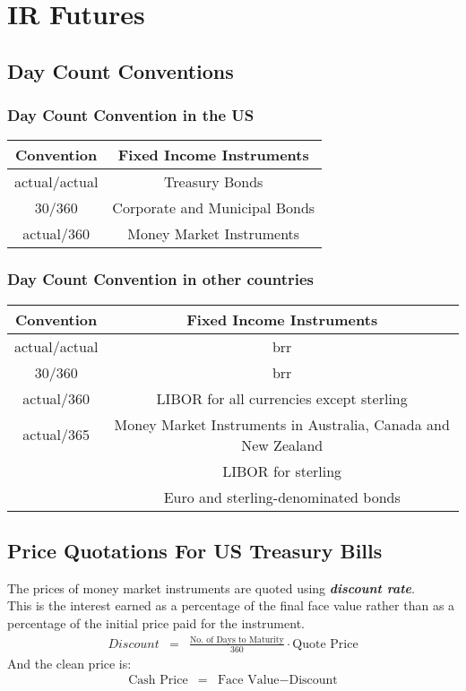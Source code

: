 \chapter{IR Futures}

\section{Day Count Conventions}

\subsection{Day Count Convention in the US}
\begin{tabular}{|c|c|}
	\hline 
	\textbf{Convention}& \textbf{Fixed Income Instruments}  \\ 
	\hline 
	actual/actual & Treasury Bonds \\ 
	\hline 
	30/360 & Corporate and Municipal Bonds \\ 
	\hline 
	actual/360 & Money Market Instruments \\ 
	\hline 
\end{tabular}

\subsection{Day Count Convention in other countries}

\begin{tabular}{|c|c|}
	\hline 
	\textbf{Convention}& \textbf{Fixed Income Instruments}  \\ 
	\hline 
	actual/actual & brr \\ 
	\hline 
	30/360 & brr \\ 
	\hline 
	actual/360 & LIBOR for all currencies except sterling \\ 
	\hline 
	actual/365 & Money Market Instruments in Australia, Canada and New Zealand\\
	& LIBOR for sterling  \\
	& Euro and sterling-denominated bonds\\
	\hline 
\end{tabular}

\section{Price Quotations For US Treasury Bills}
The prices of money market instruments are quoted using \textbf{\textit{discount rate}}.\\
This is the interest earned as a percentage of the final face value rather than as a percentage of the initial price paid for the instrument.
\begin{eqnarray}
	Discount &=& \frac{\text{No. of Days to Maturity}}{360}\cdot \text{Quote Price}
\end{eqnarray}
And the clean price is:
\begin{eqnarray}
	\text{Cash Price} &=& \text{Face Value} - \text{Discount} 
\end{eqnarray}

